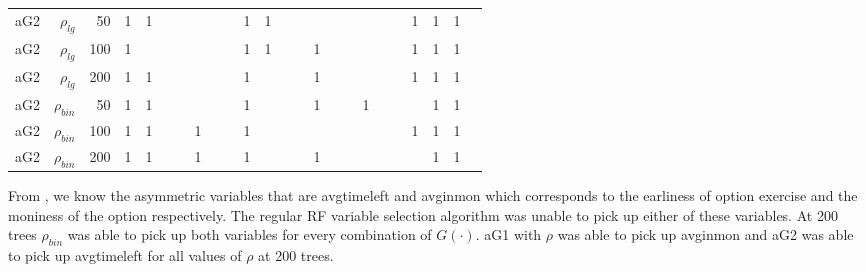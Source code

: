 \documentclass[twoside,11pt]{article}
\begin{document}
\begin{table}[htbp]
\begin{tabular}{rrr|rrrrrrrrrrrrrrrrrrrrr}
    \hline
    aG2   & $\rho_{lg}$ & 50    & 1     & 1     &       &       &       &       &       & 1     & 1     &       &       &       &       &       &       &       &       & 1     & 1     & 1     &  \bigstrut[t]\\
    aG2   & $\rho_{lg}$ & 100   & 1     &       &       &       &       &       &       & 1     & 1     &       &       & 1     &       &       &       &       &       & 1     & 1     & 1     &  \\
    aG2   & $\rho_{lg}$ & 200   & 1     & 1     &       &       &       &       &       & 1     &       &       &       & 1     &       &       &       &       &       & 1     & 1     & 1     &  \bigstrut[b]\\
    \hline
    aG2   & $\rho_{bin}$ & 50    & 1     & 1     &       &       &       &       &       & 1     &       &       &       & 1     &       &       & 1     &       &       &       & 1     & 1     &  \bigstrut[t]\\
    aG2   & $\rho_{bin}$ & 100   & 1     & 1     &       &       & 1     &       &       & 1     &       &       &       &       &       &       &       &       &       & 1     & 1     & 1     &  \\
    aG2   & $\rho_{bin}$ & 200   & 1     & 1     &       &       & 1     &       &       & 1     &       &       &       & 1     &       &       &       &       &       &       & 1     & 1     &  \bigstrut[b]\\
    \hline
    \end{tabular}%
  \label{asymliveresults}%
\end{table}%

From \citet{Wei06a}, we know the asymmetric variables that are avgtimeleft and avginmon which corresponds to the earliness of option exercise and the moniness of the option respectively. The regular RF variable selection algorithm was unable to pick up either of these variables. At 200 trees $\rho_{bin}$ was able to pick up both variables for every combination of $G(\cdot)$. aG1 with $\rho$ was able to pick up avginmon and aG2 was able to pick up avgtimeleft for all values of $\rho$ at 200 trees. 
\end{document}

